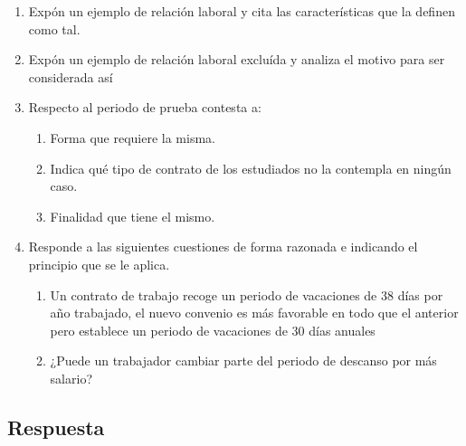 \begin{enumerate}[label=(\alph*)]
    \item Expón un ejemplo de relación laboral y cita las características que la definen como tal.
    \item Expón un ejemplo de relación laboral excluída y analiza el motivo para ser considerada así
    \item Respecto al periodo de prueba contesta a:
    \begin{enumerate}[label=\arabic*.]
        \item Forma que requiere la misma.
        \item Indica qué tipo de contrato de los estudiados no la contempla en ningún caso.
        \item Finalidad que tiene el mismo.
    \end{enumerate}
    \item Responde a las siguientes cuestiones de forma razonada e indicando el principio que se le aplica.
        \begin{enumerate}[label=\arabic*.]
        \item Un contrato de trabajo recoge un periodo de vacaciones de 38 días por año trabajado, el nuevo convenio es más favorable en todo que el anterior pero establece un periodo de vacaciones de 30 días anuales
        \item ¿Puede un trabajador cambiar parte del periodo de descanso por más salario?
    \end{enumerate}
\end{enumerate}

\subsection{Respuesta}


